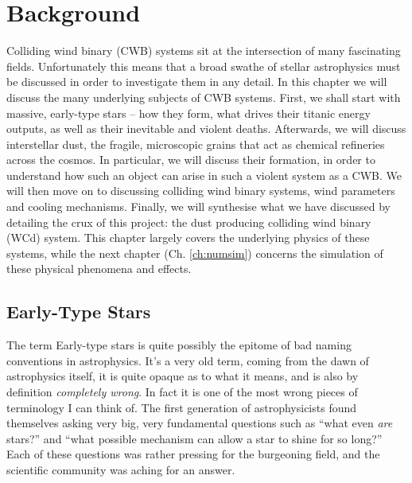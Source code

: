 \chapter{Background}
\label{ch:background}

Colliding wind binary (CWB) systems sit at the intersection of many fascinating fields.
Unfortunately this means that a broad swathe of stellar astrophysics must be discussed in order to investigate them in any detail.
In this chapter we will discuss the many underlying subjects of CWB systems.
First, we shall start with massive, early-type stars -- how they form, what drives their titanic energy outputs, as well as their inevitable and violent deaths.
Afterwards, we will discuss interstellar dust, the fragile, microscopic grains that act as chemical refineries across the cosmos.
In particular, we will discuss their formation,  in order to understand how such an object can arise in such a violent system as a CWB.
We will then move on to discussing colliding wind binary systems, wind parameters and cooling mechanisms.
Finally, we will synthesise what we have discussed by detailing the crux of this project: the dust producing colliding wind binary (WCd) system.
This chapter largely covers the underlying physics of these systems, while the next chapter (Ch. \ref{ch:numsim}) concerns the simulation of these physical phenomena and effects. 

\section{Early-Type Stars}
\label{sec:earlytype}
\label{sec:obtype}

The term Early-type stars is quite possibly the epitome of bad naming conventions in astrophysics.
It's a very old term, coming from the dawn of astrophysics itself, it is quite opaque as to what it means, and is also by definition \textit{completely wrong}.
In fact it is one of the most wrong pieces of terminology I can think of.
The first generation of astrophysicists found themselves asking very big, very fundamental questions such as ``what even \textit{are} stars?'' and ``what possible mechanism can allow a star to shine for so long?''
Each of these questions was rather pressing for the burgeoning field, and the scientific community was aching for an answer.

